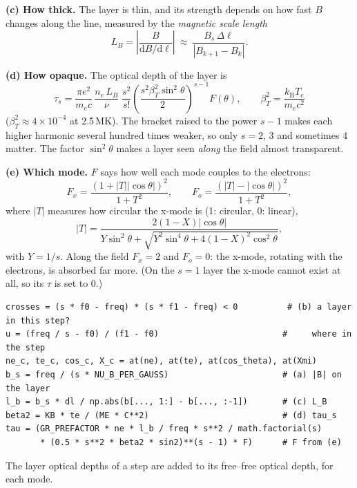 \documentclass[11pt,a4paper]{article}
\newcommand{\dd}{\mathrm{d}}
\newcommand{\kB}{k_\mathrm{B}}
\begin{document}
\textbf{(c) How thick.} The layer is thin, and its strength depends on how fast $B$ changes
along the line, measured by the \emph{magnetic scale length}
\begin{equation}
  L_B=\left|\frac{B}{\dd B/\dd\ell}\right|\ \approx\ \frac{B_s\,\Delta\ell}{|B_{k+1}-B_k|}.
\end{equation}

\textbf{(d) How opaque.} The optical depth of the layer is
\begin{equation}
  \boxed{\;
  \tau_s=\frac{\pi e^2}{m_ec}\,\frac{n_e\,L_B}{\nu}\;\frac{s^2}{s!}
   \left(\frac{s^2\beta_T^2\sin^2\theta}{2}\right)^{s-1}F(\theta),\qquad
   \beta_T^2=\frac{\kB T_e}{m_ec^2}\;}
\end{equation}
($\beta_T^2\approx4\times10^{-4}$ at 2.5\,MK). The bracket raised to the power $s-1$ makes each higher
harmonic several hundred times weaker, so only $s=2$, 3 and sometimes 4 matter. The factor
$\sin^2\theta$ makes a layer seen \emph{along} the field almost transparent.

\textbf{(e) Which mode.} $F$ says how well each mode couples to the electrons:
\begin{equation}
  F_x=\frac{(1+|T||\cos\theta|)^2}{1+T^2},\qquad F_o=\frac{(|T|-|\cos\theta|)^2}{1+T^2},
\end{equation}
where $|T|$ measures how circular the x-mode is (1: circular, 0: linear),
\begin{equation}
  |T|=\frac{2(1-X)|\cos\theta|}{Y\sin^2\theta+\sqrt{Y^2\sin^4\theta+4(1-X)^2\cos^2\theta}},
\end{equation}
with $Y=1/s$. Along the field $F_x=2$ and $F_o=0$: the x-mode, rotating with the electrons, is
absorbed far more. (On the $s=1$ layer the x-mode cannot exist at all, so its $\tau$ is set to 0.)

\begin{lstlisting}
crosses = (s * f0 - freq) * (s * f1 - freq) < 0          # (b) a layer in this step?
u = (freq / s - f0) / (f1 - f0)                         #     where in the step
ne_c, te_c, cos_c, X_c = at(ne), at(te), at(cos_theta), at(Xmi)
b_s = freq / (s * NU_B_PER_GAUSS)                       # (a) |B| on the layer
l_b = b_s * dl / np.abs(b[..., 1:] - b[..., :-1])       # (c) L_B
beta2 = KB * te / (ME * C**2)                           # (d) tau_s
tau = (GR_PREFACTOR * ne * l_b / freq * s**2 / math.factorial(s)
       * (0.5 * s**2 * beta2 * sin2)**(s - 1) * F)      # F from (e)
\end{lstlisting}
The layer optical depths of a step are added to its free--free optical depth, for each mode.
\end{document}
